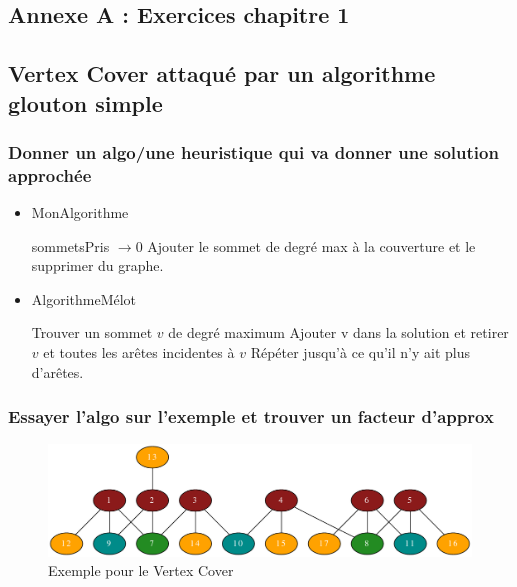 \documentclass{article}
\begin{document}
\begin{sffamily}
\section{Annexe A : Exercices chapitre 1}\label{exochap1}

\subsection{Vertex Cover attaqué par un algorithme glouton simple}

\subsubsection*{Donner un algo/une heuristique qui va donner une solution approchée}

\begin{itemize}
\item[]
\begin{algorithm}[h!]
\caption{MonAlgorithme}
\begin{algorithmic}[1]
\STATE sommetsPris $\rightarrow 0$
\STATE Ajouter le sommet de degré max à la couverture et le supprimer du graphe.
\ENDWHILE
\end{algorithmic}
\end{algorithm}
\item[]
\begin{algorithm}[h!]
\caption{AlgorithmeMélot}
\begin{algorithmic}[1]
\STATE Trouver un sommet $v$ de degré maximum
\STATE Ajouter v dans la solution et retirer $v$ et toutes les arêtes incidentes à $v$
\STATE Répéter jusqu'à ce qu'il n'y ait plus d'arêtes.
\end{algorithmic}
\end{algorithm}
\end{itemize}

\subsubsection*{Essayer l'algo sur l'exemple et trouver un facteur d'approx}

\begin{figure}[h!]
    \begin{center}
    \includegraphics[width=\textwidth]{exo_1_5.pdf}
    \caption{Exemple pour le Vertex Cover}
    \end{center}	
\end{figure}


\end{sffamily}
\end{document}
